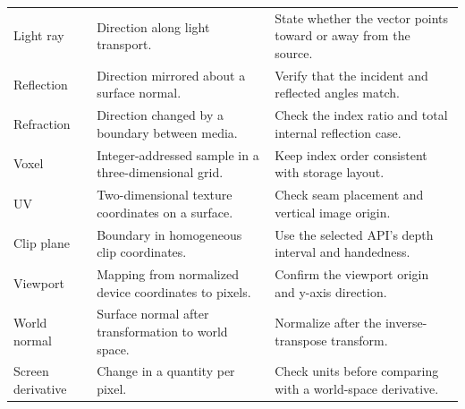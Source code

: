 \documentclass[11pt,twoside,openany]{book}
\begin{document}
\begin{longtable}{@{}>{\raggedright\arraybackslash}p{}>{\raggedright\arraybackslash}p{}>{\raggedright\arraybackslash}p{}@{}}
Light ray & Direction along light transport. & State whether the vector points toward or away from the source. \\
Reflection & Direction mirrored about a surface normal. & Verify that the incident and reflected angles match. \\
Refraction & Direction changed by a boundary between media. & Check the index ratio and total internal reflection case. \\
Voxel & Integer-addressed sample in a three-dimensional grid. & Keep index order consistent with storage layout. \\
UV & Two-dimensional texture coordinates on a surface. & Check seam placement and vertical image origin. \\
Clip plane & Boundary in homogeneous clip coordinates. & Use the selected API's depth interval and handedness. \\
Viewport & Mapping from normalized device coordinates to pixels. & Confirm the viewport origin and y-axis direction. \\
World normal & Surface normal after transformation to world space. & Normalize after the inverse-transpose transform. \\
Screen derivative & Change in a quantity per pixel. & Check units before comparing with a world-space derivative. \\
\bottomrule
\end{longtable}
\end{document}
